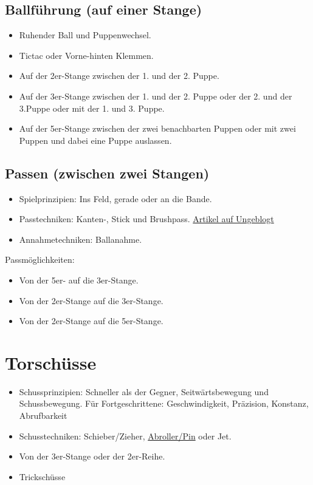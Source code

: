 \subsection{Ballführung (auf einer Stange)} 
\label{technik:ballkontrolle:eine}

\begin{itemize}
\item Ruhender Ball und Puppenwechsel.
\item Tictac oder Vorne-hinten Klemmen.
\item Auf der 2er-Stange zwischen der 1. und der 2. Puppe.
\item Auf der 3er-Stange zwischen der 1. und der 2. Puppe oder der 2. und der 3.Puppe oder mit der 1. und 3. Puppe.
\item Auf der 5er-Stange zwischen der zwei benachbarten Puppen oder mit zwei Puppen und dabei eine Puppe auslassen.
\end{itemize}


\subsection{Passen (zwischen zwei Stangen)}
\label{technik:ballkontrolle:zwei}

\begin{itemize}
\item Spielprinzipien: Ins Feld, gerade oder an die Bande.
\item Passtechniken: Kanten-, Stick und Brushpass. 
\href{http://ungeblogtkickern.blogspot.de/2015/09/schrag-schieen.html}{Artikel auf Ungeblogt}
\item Annahmetechniken: Ballanahme.
\end{itemize}

Passmöglichkeiten:
\begin{itemize}
\item Von der 5er- auf die 3er-Stange.
\item Von der 2er-Stange auf die 3er-Stange.
\item Von der 2er-Stange auf die 5er-Stange.
\end{itemize}


\section{Torschüsse}
\label{technik:torschuesse}

\begin{itemize}
\item Schussprinzipien: Schneller als der Gegner, Seitwärtsbewegung und Schussbewegung. Für Fortgeschrittene: Geschwindigkeit, Präzision, Konstanz, Abrufbarkeit
\item Schusstechniken: Schieber/Zieher, \href{http://ungeblogtkickern.blogspot.de/2014/07/schritt-fur-schritt-pin-schieen.html}{Abroller/Pin} oder Jet.
\item Von der 3er-Stange oder der 2er-Reihe.
\item Trickschüsse
\end{itemize}





